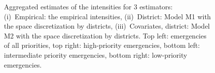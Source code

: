 \documentclass[article]{jss}
\begin{document}
\begin{figure}
\centering
\resizebox{\textwidth}{!}{
\begin{tabular}{cc}
\texttt{[image: AllstepsDistrictb\_v2.pdf]}&
\texttt{[image: AllstepsDistrictP1b\_v2.pdf]}\\
\texttt{[image: AllstepsDistrictP2b\_v2.pdf]}&
\texttt{[image: AllstepsDistrictP3b\_v2.pdf]}
\end{tabular}}
\caption{Aggregated estimates of the intensities for 3 estimators: (i)~Empirical: the empirical intensities, (ii)~District: Model M1 with the space discretization by districts, (iii)~Covariates, district: Model M2 with the space discretization by districts.
Top left: emergencies of all priorities, top right: high-priority emergencies, bottom left: intermediate priority emergencies, bottom right: low-priority emergencies.
\label{fig:allstepsdist}}
\end{figure}


\end{document}
